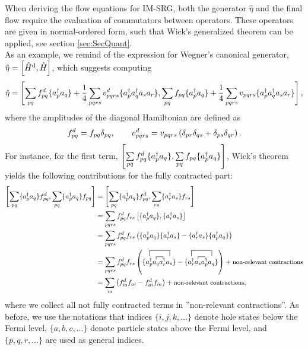 When deriving the flow equations for IM-SRG, both the generator $\hat{\eta}$ and the final flow require the evaluation of commutators between operators. These operators are given in normal-ordered form, such that Wick's generalized theorem can be applied, see section \ref{sec:SecQuant}.\\
As an example, we remind of the expression for Wegner's canonical generator, $\hat{\eta} = \left[ \hat{H}^{\rm d}, \hat{H} \right]$, which suggests computing
\[
\hat {\eta} = \left[
 \sum\limits_{pq}f_{pq}^d \lbrace a_p^\dagger a_q\rbrace + \frac{1}{4}\sum\limits_{pqrs}v_{pqrs}^d \lbrace a_p^\dagger a_q^\dagger a_s a_r \rbrace,
  \sum\limits_{pq}f_{pq}\lbrace a_p^\dagger a_q\rbrace + \frac{1}{4}\sum\limits_{pqrs}v_{pqrs} \lbrace a_p^\dagger a_q^\dagger a_s a_r \rbrace
\right],
\]
where the amplitudes of the diagonal Hamiltonian are defined as
\[
f_{pq}^d = f_{pq}\delta_{pq}, \qquad v_{pqrs}^d = v_{pqrs}\left( \delta_{pr}\delta_{qs} + \delta_{ps}\delta_{qr} \right).
\]
For instance, for the first term, $\left[\sum\limits_{pq}f_{pq}^d \lbrace a_p^\dagger a_q\rbrace, \sum\limits_{pq}f_{pq}\lbrace a_p^\dagger a_q\rbrace\right]$, Wick's theorem yields the following contributions for the fully contracted part:
\begin{align*}
\left[ \sum_{pq} \lbrace \ad_p a_q \rbrace f_{pq}^d, \sum_{pq} \lbrace \ad_p a_q \rbrace f_{pq} \right] &= 
\left[ \sum_{pq} \lbrace \ad_p a_q \rbrace f_{pq}^d, \sum_{rs} \lbrace \ad_r a_s \rbrace f_{rs} \right] \\
&= \sum_{pqrs} f_{pq}^d f_{rs} \left[ \lbrace \ad_p a_q\rbrace,\lbrace \ad_r a_s \rbrace\right] \\
&= \sum_{pqrs} f_{pq}^d f_{rs} \lb \lbrace \ad_p a_q \rbrace\lbrace \ad_r a_s \rbrace - \lbrace \ad_r a_s \rbrace \lbrace \ad_p a_q \rbrace \rb \\
&= \sum_{pqrs} f_{pq}^d f_{rs}
 \lb  
\lbrace
\contraction[2ex]{}{\ad_p}{a_q \ad_r}{a_s}
\contraction{\ad_p}{a_q}{}{\ad_r} 
 \ad_p a_q \ad_r a_s\rbrace -
 \lbrace \contraction[2ex]{}{\ad_r}{a_s \ad_p}{a_q}
\contraction{\ad_r}{a_s}{}{\ad_p} 
 {\ad_r a_s \ad_p a_q}\rbrace
\rb + \text{\small non-relevant contractions} \\
&=\sum_{ia} \lb f_{ia}^d f_{ai} - f_{ai}^d f_{ia} \rb + \text{\small non-relevant contractions},
\end{align*}
where we collect all not fully contracted terms in ''non-relevant contractions''. As before, we use the notations that indices $\lbrace i,j,k,\dots\rbrace
$ denote hole states below the Fermi level, $\lbrace a,b,c,\dots\rbrace$ denote particle states above the Fermi level, and $\lbrace p,q,r,\dots\rbrace$ are used as general indices.\\
